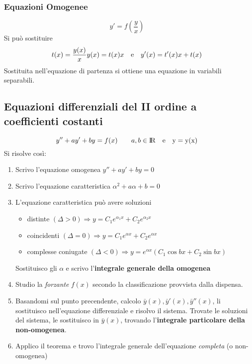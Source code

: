 \documentclass[10pt,a4paper,fleqn]{article}
\begin{document}
	\subsubsection{Equazioni Omogenee}
	\begin{equation}
		y'=f\left(\frac{y}{x}\right)
	\end{equation}
	Si può sostituire 
	\begin{equation}
		t(x)=\frac{y(x)}{x} \\ y(x) = t(x)x \quad \text{e} \quad y'(x) = t'(x)x + t(x)
	\end{equation}
	Sostituita nell'equazione di partenza si ottiene una equazione in variabili separabili.

	\subsection{Equazioni differenziali del II ordine a coefficienti costanti}

	\begin{equation}
		y'' + ay' + by = f(x) \qquad a,b \in \rm I\!R \quad \text{e} \quad y = y(x)
	\end{equation}
	Si risolve così:
	\begin{enumerate}
		\item Scrivo l'equazione omogenea $y'' + ay' + by = 0$
		\item Scrivo l'equazione caratteristica $\alpha^2 + a\alpha + b = 0$
		\item L'equazione caratteristica può avere soluzioni
			\begin{itemize}
				\item distinte $\left(\Delta > 0\right)\Rightarrow y = C_1e^{\alpha_1 x} + C_2e^{\alpha_2 x}$
				\item coincidenti $\left(\Delta = 0\right)\Rightarrow y = C_1e^{\alpha x} + C_2e^{\alpha x}$
				\item complesse coniugate $\left(\Delta < 0\right)\Rightarrow y = e^{\alpha x}\left(C_1\cos bx + C_2 \sin bx\right)$
			\end{itemize}
			Sostituisco gli $\alpha$ e scrivo l'\textbf{integrale generale della omogenea}
		\item Studio la \emph{forzante} $f(x)$ secondo la classificazione provvista dalla dispensa. 
		\item Basandomi sul punto precendente, calcolo $\bar y(x), \bar y'(x), \bar y''(x)$, li sostituisco nell'equazione differenziale e risolvo il sistema. Trovate le soluzioni del sistema, le sostituisco in $\bar y(x)$, trovando l'\textbf{integrale particolare della non-omogenea}.
		\item Applico il teorema e trovo l'integrale generale dell'equazione \emph{completa} (o non-omogenea)
	\end{enumerate}
\end{document}
